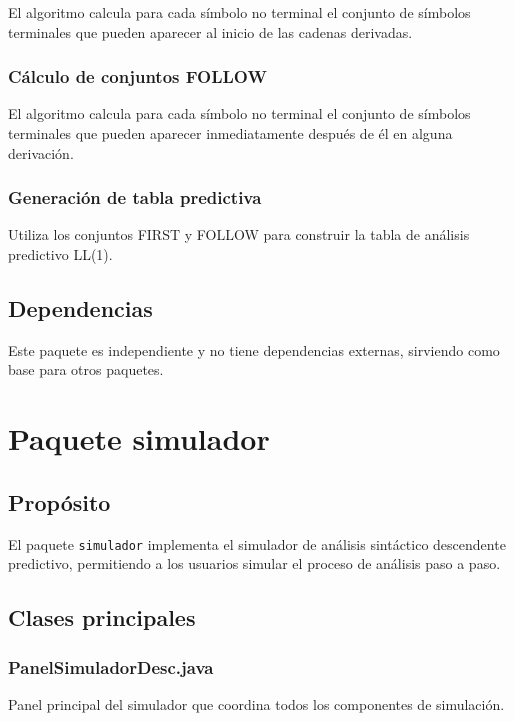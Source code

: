 El algoritmo calcula para cada símbolo no terminal el conjunto de símbolos terminales que pueden aparecer al inicio de las cadenas derivadas.

\subsubsection{Cálculo de conjuntos FOLLOW}

El algoritmo calcula para cada símbolo no terminal el conjunto de símbolos terminales que pueden aparecer inmediatamente después de él en alguna derivación.

\subsubsection{Generación de tabla predictiva}

Utiliza los conjuntos FIRST y FOLLOW para construir la tabla de análisis predictivo LL(1).

\subsection{Dependencias}

Este paquete es independiente y no tiene dependencias externas, sirviendo como base para otros paquetes.

\section{Paquete simulador}

\subsection{Propósito}

El paquete \texttt{simulador} implementa el simulador de análisis sintáctico descendente predictivo, permitiendo a los usuarios simular el proceso de análisis paso a paso.

\subsection{Clases principales}

\subsubsection{PanelSimuladorDesc.java}

Panel principal del simulador que coordina todos los componentes de simulación.

